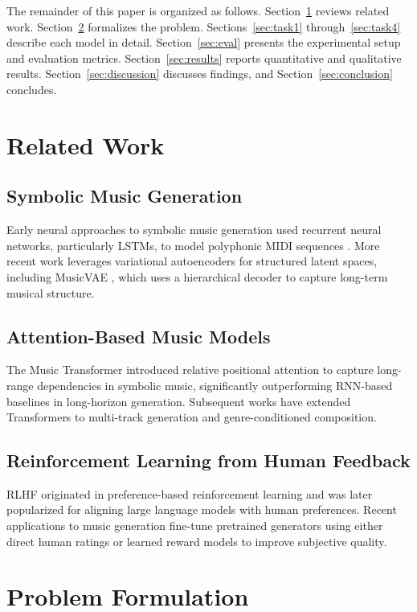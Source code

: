 \documentclass[conference]{IEEEtran}
\begin{document}
The remainder of this paper is organized as follows. Section~\ref{sec:related}
reviews related work. Section~\ref{sec:problem} formalizes the problem.
Sections~\ref{sec:task1} through~\ref{sec:task4} describe each model in
detail. Section~\ref{sec:eval} presents the experimental setup and
evaluation metrics. Section~\ref{sec:results} reports quantitative and
qualitative results. Section~\ref{sec:discussion} discusses findings, and
Section~\ref{sec:conclusion} concludes.

\section{Related Work} \label{sec:related}

\subsection{Symbolic Music Generation}
Early neural approaches to symbolic music generation used recurrent neural
networks, particularly LSTMs, to model polyphonic MIDI sequences \cite{b2}.
More recent work leverages variational autoencoders for structured latent
spaces, including MusicVAE \cite{b3}, which uses a hierarchical decoder to
capture long-term musical structure.

\subsection{Attention-Based Music Models}
The Music Transformer \cite{b4} introduced relative positional attention to
capture long-range dependencies in symbolic music, significantly
outperforming RNN-based baselines in long-horizon generation. Subsequent
works have extended Transformers to multi-track generation and
genre-conditioned composition.

\subsection{Reinforcement Learning from Human Feedback}
RLHF originated in preference-based reinforcement learning \cite{b5} and was
later popularized for aligning large language models with human
preferences. Recent applications to music generation fine-tune pretrained
generators using either direct human ratings or learned reward models to
improve subjective quality.

\section{Problem Formulation} \label{sec:problem}
\end{document}
